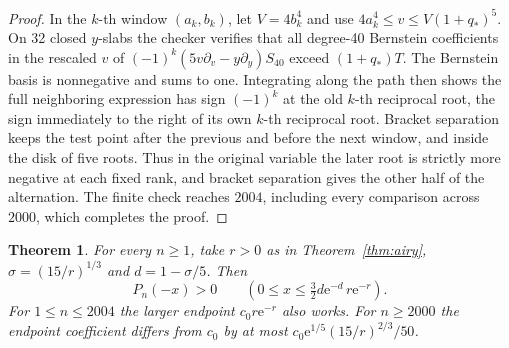 \documentclass[11pt]{article}
\newtheorem{theorem}{Theorem}
\newcommand{\ee}{\mathrm e}
\begin{document}
\begin{proof}
In the \(k\)-th window \((a_k,b_k)\), let \(V=4b_k^4\) and use \(4a_k^4\le v\le V(1+q_*)^5\). On 32 closed \(y\)-slabs the checker verifies that all degree-40 Bernstein coefficients in the rescaled \(v\) of
\((-1)^k(5v\partial_v-y\partial_y)S_{40}\) exceed \((1+q_*)T\).
The Bernstein basis is nonnegative and sums to one. Integrating along the path then shows the full neighboring expression has sign \((-1)^k\) at the old \(k\)-th reciprocal root, the sign immediately to the right of its own \(k\)-th reciprocal root. Bracket separation keeps the test point after the previous and before the next window, and inside the disk of five roots. Thus in the original variable the later root is strictly more negative at each fixed rank, and bracket separation gives the other half of the alternation. The finite check reaches \(2004\), including every comparison across \(2000\), which completes the proof.
\end{proof}

\begin{theorem}\label{thm:innereffective}
For every \(n\ge1\), take \(r>0\) as in Theorem~\ref{thm:airy}, \(\sigma=(15/r)^{1/3}\) and \(d=1-\sigma/5\). Then
\[
 P_n(-x)>0\qquad
 \left(0\le x\le\tfrac32 d\ee^{-d}\,r\ee^{-r}\right).
\]
For \(1\le n\le2004\) the larger endpoint \(c_0r\ee^{-r}\) also works. For \(n\ge2000\) the endpoint coefficient differs from \(c_0\) by at most \(c_0\ee^{1/5}(15/r)^{2/3}/50\).
\end{theorem}
\end{document}
